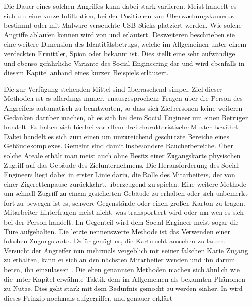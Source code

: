 Die Dauer eines solchen Angriffes kann dabei stark variieren.
Meist handelt es sich um eine kurze Infiltration, bei der Positionen von Überwachungskameras bestimmt oder mit Malware verseuchte USB-Sticks  platziert werden.
Wie solche Angriffe ablaufen können wird von  \citep{hadnagy} und \citep{hacking-the-human} erläutert.
Desweiteren beschrieben sie eine weitere Dimension des Identitätsbetrugs, welche im Allgemeinen unter einem verdeckten Ermittler, Spion oder  bekannt ist.
Dies stellt eine sehr aufwändige und ebenso gefährliche Variante des Social Engineering dar und wird ebenfalls in diesem Kapitel anhand eines kurzen Beispiels erläutert.

Die zur Verfügung stehenden Mittel sind überraschend simpel.
Ziel dieser Methoden ist es allerdings immer, unausgesprochene Fragen über die Person des Angreifers automatisch zu beantworten, so dass sich Zielpersonen keine weiteren Gedanken darüber machen, ob es sich bei dem Social Engineer um einen Betrüger handelt.
Es haben sich hierbei vor allem drei charakteristische Muster bewährt:
Dabei handelt es sich zum einen um unzureichend geschützte Bereiche eines Gebäudekomplexes.
Gemeint sind damit insbesondere Raucherbereiche.
Über solche Areale erhält man meist auch ohne Besitz einer Zugangskarte physischen Zugriff auf das Gebäude des Zielunternehmens.
Die Herausforderung des Social Engineers liegt dabei in erster Linie darin, die Rolle des Mitarbeiters, der von einer Zigerettenpause zurückkehrt, überzeugend zu spielen.
Eine weitere Methode um schnell Zugriff zu einem gesicherten Gebäude zu erhalten oder sich unbemerkt fort zu bewegen ist es, schwere Gegenstände oder einen großen Karton zu tragen.
Mitarbeiter hinterfragen meist nicht, was transportiert wird oder um wen es sich bei der Person handelt. Im Gegenteil wird dem Social Engineer meist sogar die Türe aufgehalten.
Die letzte nennenswerte Methode ist das Verwenden einer falschen Zugangskarte.
Dafür genügt es, die Karte echt aussehen zu lassen.
Versucht der Angreifer nun mehrmals vergeblich mit seiner falschen Karte Zugang zu erhalten, kann er sich an den nächsten Mitarbeiter wenden und ihn darum beten, ihn einzulassen \citep{hadnagy}.
Die eben genannten Methoden machen sich ähnlich wie die unter Kapitel  erwähnte Taktik dem im Allgemeinen als  bekannten Phänomen zu Nutze.
Dies geht stark mit dem Bedürfnis gemocht zu werden einher.
In  wird dieses Prinzip nochmals aufgegriffen und genauer erklärt.

